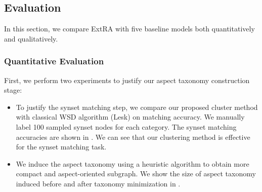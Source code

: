\subsection{Evaluation}
\label{sec:endeval}
In this section, we compare ExtRA with five baseline models 
both quantitatively and qualitatively.


\subsubsection{Quantitative Evaluation}
\label{sec:quaneval}
First, we perform two experiments to justify our aspect taxonomy construction stage:
\begin{itemize}
	\item 
	To justify the synset matching step,
	we compare our proposed cluster method with classical WSD algorithm (Lesk) on matching accuracy.
	We manually label 100 sampled synset nodes for each category.
	The synset matching accuracies are shown in 
	.
	We can see that our clustering method is effective 
	for the synset matching task.
	\item 
	We induce the aspect taxonomy using a heuristic algorithm to obtain
	more compact and aspect-oriented subgraph. 
	We show the size of aspect taxonomy induced before and after 
taxonomy minimization in .
\end{itemize}


